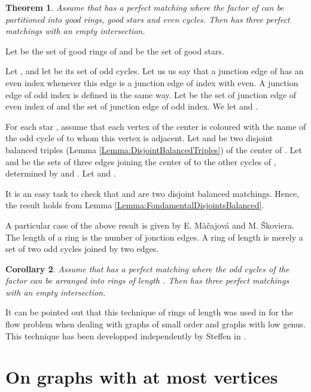 \documentclass{elsart}
\theoremstyle{plain} \theoremheaderfont{\scshape}
\newtheorem{Thm}{\bf Theorem}
\newtheorem{Cor}[Thm]{ \bf Corollary}
{\theorembodyfont{\rmfamily}
 \newtheorem{Def}[Thm]{\bf Definition}
 \newtheorem{Rem}[Thm]{\bf Remark}
 \newtheorem{Question}[Thm]{\bf Question}
 \newtheorem{Problem}[Thm]{\bf Problem}
}
\newenvironment{Prf}{{\bf \noindent Proof } }{\hfill\\}
\begin{document}
\begin{Thm} \label{Theorem:GoodRingGoodStars}
Assume that  has a perfect matching  where the factor
 of  can be partitioned into good rings, good stars
and even cycles. Then  has three perfect matchings with an empty
intersection.
\end{Thm}
\begin{Prf}
Let  be the set of good rings of  and
 be the set of good stars.

Let , and let  be its set of
odd cycles.  Let us us say that a junction edge of  has an even
index whenever this edge is a junction edge of index  with 
even. A junction edge of odd index is defined in the same way. Let
 be the set of junction edge of even index of  and  the
set of junction edge of odd index. We let  and .

For each star , assume that each vertex of the
center is coloured with the name of the odd cycle of  to whom
this vertex is adjacent.  Let  and  be two disjoint
balanced triples (Lemma \ref{Lemma:DisjointBalancedTriples}) of the
center of . Let  and  be the sets of three edges
joining the center of  to the other cycles of , determined by
 and . Let  and
.




It is an easy task to check that  and  are two
disjoint balanced matchings. Hence, the result holds from Lemma
\ref{Lemma:FondamentalDisjointsBalanced}.
\end{Prf}

A particular case of the above result is given by E.
M\`{a}\v{c}ajov\'{a} and M. \v{S}koviera. The length of a ring is
the number of jonction edges. A ring of length  is merely a set
of two odd cycles joined by two edges.
\begin{Cor}\cite{MacSko}Assume that  has a perfect matching  where the odd cycles of the factor
 can be arranged into rings of length . Then  has
three perfect matchings with an empty intersection.
\end{Cor}

It can be pointed out that this technique of rings of length  was
used in \cite{Fou85} for the  flow problem when dealing with
graphs of small order and graphs with low genus. This technique has
been developped independently  by Steffen in \cite{Ste96}.



\section{On graphs with at most  vertices}
\end{document}
